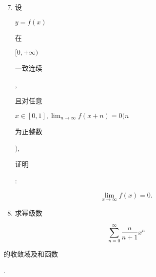 \documentclass[10pt]{article}
\begin{document}
\begin{enumerate}
  \setcounter{enumi}{6}
  \item \begin{CJK}{UTF8}{mj}设\end{CJK} $y=f(x)$ \begin{CJK}{UTF8}{mj}在\end{CJK} $[0,+\infty)$ \begin{CJK}{UTF8}{mj}一致连续\end{CJK}, \begin{CJK}{UTF8}{mj}且对任意\end{CJK} $x \in[0,1], \lim _{n \rightarrow \infty} f(x+n)=0(n$ \begin{CJK}{UTF8}{mj}为正整数\end{CJK} $)$, \begin{CJK}{UTF8}{mj}证明\end{CJK}:
\end{enumerate}
$$
\lim _{x \rightarrow \infty} f(x)=0 .
$$

\begin{enumerate}
  \setcounter{enumi}{7}
  \item \begin{CJK}{UTF8}{mj}求幂级数\end{CJK}
\end{enumerate}
$$
\sum_{n=0}^{\infty} \frac{n}{n+1} x^{n}
$$
\begin{CJK}{UTF8}{mj}的收敛域及和函数\end{CJK}.
\end{document}
